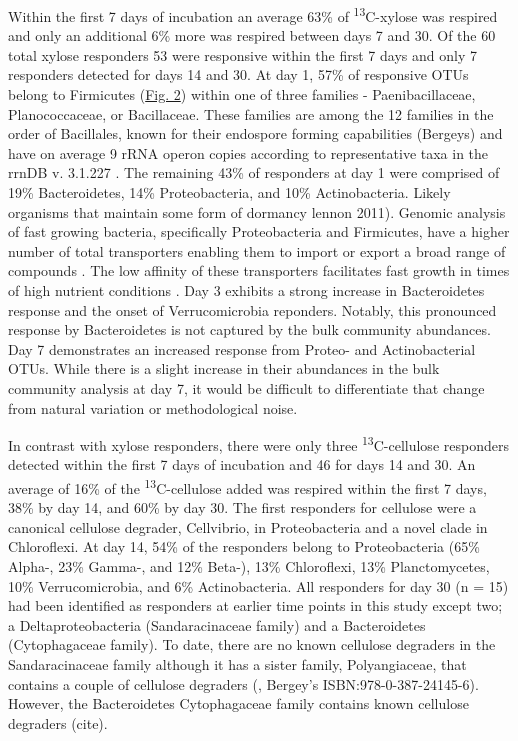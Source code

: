 Within the first 7 days of incubation an average 63\% of \textsuperscript{13}C-xylose was respired and only an additional 6\% more was respired between days 7 and 30. Of the 60 total xylose responders 53 were responsive within the first 7 days and only 7 responders detected for days 14 and 30. At day 1, 57\% of responsive OTUs belong to Firmicutes (\href{https://www.authorea.com/users/3537/articles/3612/master/file/figures/l2fc_fig1/l2fc_fig.pdf}{Fig. 2}) within one of three families - Paenibacillaceae, Planococcaceae, or Bacillaceae. These families are among the 12 families in the order of Bacillales, known for their endospore forming capabilities (Bergeys) and have on average 9 rRNA operon copies according to representative taxa in the rrnDB v. 3.1.227 \cite{18948294,11125085}. The remaining 43\% of responders at day 1 were comprised of 19\% Bacteroidetes, 14\% Proteobacteria, and 10\% Actinobacteria. Likely organisms that maintain some form of dormancy lennon 2011). Genomic analysis of fast growing bacteria, specifically Proteobacteria and Firmicutes, have a higher number of total transporters enabling them to import or export a broad range of compounds \cite{Barabote_2005}. The low affinity of these transporters facilitates fast growth in times of high nutrient conditions \cite{Trivedi_2013}. Day 3 exhibits a strong increase in Bacteroidetes response and the onset of Verrucomicrobia reponders. Notably, this pronounced response by Bacteroidetes is not captured by the bulk community abundances. Day 7 demonstrates an increased response from Proteo- and Actinobacterial OTUs. While there is a slight increase in their abundances in the bulk community analysis at day 7, it would be difficult to differentiate that change from natural variation or methodological noise.

In contrast with xylose responders, there were only three \textsuperscript{13}C-cellulose responders detected within the first 7 days of incubation and 46 for days 14 and 30. An average of 16\% of the \textsuperscript{13}C-cellulose added was respired within the first 7 days, 38\% by day 14, and 60\% by day 30. The first responders for cellulose were a canonical cellulose degrader, Cellvibrio, in Proteobacteria and a novel clade in Chloroflexi. At day 14, 54\% of the responders belong to Proteobacteria (65\% Alpha-, 23\% Gamma-, and 12\% Beta-), 13\% Chloroflexi, 13\% Planctomycetes, 10\% Verrucomicrobia, and 6\% Actinobacteria. All responders for day 30 (n = 15) had been identified as responders at earlier time points in this study except two; a Deltaproteobacteria (Sandaracinaceae family) and a Bacteroidetes (Cytophagaceae family). To date, there are no known cellulose degraders in the Sandaracinaceae family although it has a sister family, Polyangiaceae, that contains a couple of cellulose degraders (\cite{Reichenbach_2006}, Bergey's ISBN:978-0-387-24145-6). However, the Bacteroidetes Cytophagaceae family contains known cellulose degraders (cite). 

